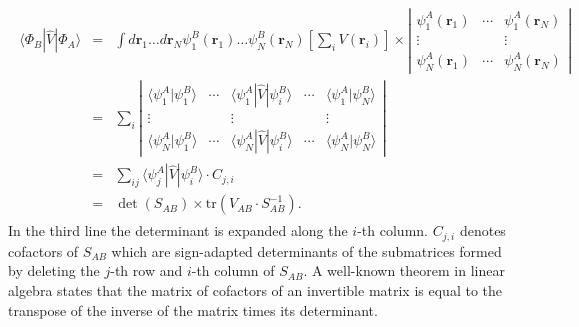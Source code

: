 \documentclass[letterpaper,10pt,english]{sphinxmanual}
\begin{document}
\begin{equation*}
\begin{split}\begin{aligned}
\langle\Phi_{B}|\hat{V}|\Phi_{A}\rangle & = & \int d\mathbf{r}_{1}\ldots d\mathbf{r}_{N}\psi_{1}^{B}(\mathbf{r}_{1})\ldots\psi_{N}^{B}(\mathbf{r}_{N})\left[\sum_{i}V(\mathbf{r}_{i})\right]\times\left|\begin{array}{ccc}
\psi_{1}^{A}(\mathbf{r}_{1}) & \cdots & \psi_{1}^{A}(\mathbf{r}_{N})\\
\vdots &  & \vdots\\
\psi_{N}^{A}(\mathbf{r}_{1}) & \cdots & \psi_{N}^{A}(\mathbf{r}_{N})
\end{array}\right|\nonumber \\
 & = & \sum_{i}\left|\begin{array}{ccccc}
\langle\psi_{1}^{A}|\psi_{1}^{B}\rangle & \cdots & \langle\psi_{1}^{A}|\hat{V}|\psi_{i}^{B}\rangle & \cdots & \langle\psi_{1}^{A}|\psi_{N}^{B}\rangle\\
\vdots &  & \vdots &  & \vdots\\
\langle\psi_{N}^{A}|\psi_{1}^{B}\rangle & \cdots & \langle\psi_{N}^{A}|\hat{V}|\psi_{i}^{B}\rangle & \cdots & \langle\psi_{N}^{A}|\psi_{N}^{B}\rangle
\end{array}\right|\nonumber \\
 & = & \sum_{ij}\langle\psi_{j}^{A}|\hat{V}|\psi_{i}^{B}\rangle\cdot C_{j,i}\nonumber \\
 & = & \det\left(S_{AB}\right)\times\text{tr}\left(V_{AB}\cdot S_{AB}^{-1}\right).\end{aligned}\end{split}
\end{equation*}
In the third line the determinant is expanded along the \(i\)-th
column. \(C_{j,i}\) denotes cofactors of \(S_{AB}\) which are
sign-adapted determinants of the submatrices formed by deleting the
\(j\)-th row and \(i\)-th column of \(S_{AB}\). A well-known
theorem in linear algebra states that the matrix of cofactors of an
invertible matrix is equal to the transpose of the inverse of the matrix
times its determinant.
\end{document}
